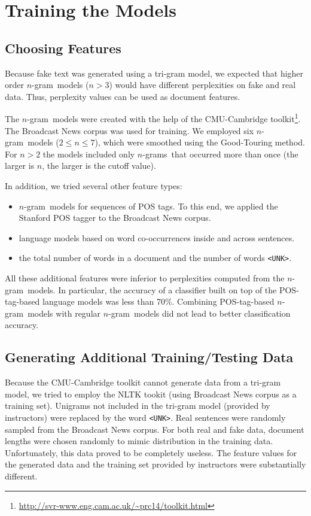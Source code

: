 \documentclass[11pt]{article}
\newcommand{\ngram}{\mbox{$n$-gram }}
\newcommand{\ngrams}{\mbox{$n$-grams }}
\newcommand{\leocomment}[1]{\todo[color=red!40,caption={Leo's comment}]{#1}}
\begin{document}
\section{Training the Models}
\subsection{Choosing Features} Because fake text was generated using a tri-gram model, we expected that
higher order \ngram models ($n>3$) would have different perplexities on fake and real data.
Thus, perplexity values can be used as document features.

The \ngram models were created with the help of the CMU-Cambridge toolkit\footnote{\url{http://svr-www.eng.cam.ac.uk/~prc14/toolkit.html}}.  The Broadcast News corpus was used for training.
We employed six \ngram models ($2 \le n \le 7$), which were smoothed using the Good-Touring method.
For $n>2$ the models included only \ngrams that occurred more than once (the larger is $n$, the larger is the cutoff value).

In addition, we tried several other feature types:
\begin{itemize}
\item \ngram models for sequences of POS tags. To this end, we applied the Stanford POS tagger
to the Broadcast News corpus.
\item language models based on word co-occurrences inside and across sentences.  \leocomment{Di, please, expand here.}
\item the total number of words in a document and the number of words \texttt{<UNK>}.
\end{itemize}
All these additional features were inferior to perplexities computed from the \ngram models.
In particular, the accuracy of a classifier built on top of the POS-tag-based language models
was less than 70\%. Combining POS-tag-based \ngram models with regular \ngram models did not lead
to better classification accuracy.

\subsection{Generating Additional Training/Testing Data}\label{SectGen}
Because the CMU-Cambridge toolkit cannot generate data from a tri-gram model,
we tried to employ the NLTK tookit (using Broadcast News corpus as a training set).
Unigrams not included in the tri-gram model (provided by instructors) were replaced by the word \texttt{<UNK>}.
Real sentences were randomly sampled from the Broadcast News corpus.
For both real and fake data, document lengths were chosen randomly to mimic distribution in the training data.
Unfortunately, this data proved to be completely useless. The feature values for the generated data
and the training set provided by instructors were substantially different.
\end{document}

